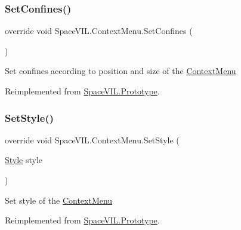 \subsubsection{\texorpdfstring{Set\+Confines()}{SetConfines()}}
{\footnotesize\ttfamily override void Space\+V\+I\+L.\+Context\+Menu.\+Set\+Confines (\begin{DoxyParamCaption}{ }\end{DoxyParamCaption})\hspace{0.3cm}{\ttfamily [virtual]}}



Set confines according to position and size of the \mbox{\hyperlink{class_space_v_i_l_1_1_context_menu}{Context\+Menu}} 



Reimplemented from \mbox{\hyperlink{class_space_v_i_l_1_1_prototype_af063fd80d51a3c42c8f43e0e97b6b809}{Space\+V\+I\+L.\+Prototype}}.

\mbox{\label{class_space_v_i_l_1_1_context_menu_a92517e2e7ef73ccdadfa5b4016af403b}} 
\subsubsection{\texorpdfstring{Set\+Style()}{SetStyle()}}
{\footnotesize\ttfamily override void Space\+V\+I\+L.\+Context\+Menu.\+Set\+Style (\begin{DoxyParamCaption}\item[{\mbox{\hyperlink{class_space_v_i_l_1_1_decorations_1_1_style}{Style}}}]{style }\end{DoxyParamCaption})\hspace{0.3cm}{\ttfamily [virtual]}}



Set style of the \mbox{\hyperlink{class_space_v_i_l_1_1_context_menu}{Context\+Menu}} 



Reimplemented from \mbox{\hyperlink{class_space_v_i_l_1_1_prototype_ae96644a6ace490afb376fb542161e541}{Space\+V\+I\+L.\+Prototype}}.

\mbox{\label{class_space_v_i_l_1_1_context_menu_a732b019d164e73d1fb165a2e1c065a50}} 
